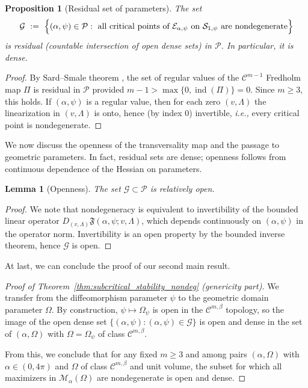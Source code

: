 \documentclass[reqno,11pt]{amsart}
\newtheorem{lemma}[theorem]{Lemma}
\newtheorem{proposition}[theorem]{Proposition}
\theoremstyle{definition}
\begin{document}
\begin{proposition}[Residual set of parameters]\label{prop:residual}
The set
\[
\mathcal{G}\ :=\ \Bigl\{(\alpha,\psi)\in\mathcal{P}:\ \text{all critical points of $\mathcal{E}_{\alpha,\psi}$
on $\mathcal{S}_{1,\psi}$ are nondegenerate}\Bigr\}
\]
is residual (countable intersection of open dense sets) in $\mathcal{P}$. In particular, it is dense.
\end{proposition}

\begin{proof}
By Sard--Smale theorem \cite[Theorem~1.3]{MR185604}, the set of regular values of the $\mathcal{C}^{m-1}$ Fredholm map $\Pi$ is residual in
$\mathcal{P}$ provided $m-1>\max\{0,\operatorname{ind}(\Pi)\}=0$. Since $m\ge 3$, this holds.
If $(\alpha,\psi)$ is a regular value, then for each zero $(v,\Lambda)$ the linearization in $(v,\Lambda)$
is onto, hence (by index $0$) invertible, {\it i.e.,} every critical point is nondegenerate.
\end{proof}


We now discuss the openness of the transversality map and the passage to geometric parameters.
In fact, residual sets are dense; openness follows from continuous dependence of the Hessian on parameters.

\begin{lemma}[Openness]\label{lem:open}
The set $\mathcal{G}\subset \mathcal{P}$ is relatively open.
\end{lemma}

\begin{proof} 
We note that nondegeneracy is equivalent to invertibility of the bounded linear operator
$D_{(v,\Lambda)}\mathfrak{F}(\alpha,\psi;v,\Lambda)$, which depends continuously on $(\alpha,\psi)$ in the operator norm.
Invertibility is an open property by the bounded inverse theorem, hence $\mathcal{G}$ is open.
\end{proof}

At last, we can conclude the proof of our second main result.
\begin{proof}[Proof of Theorem~\ref{thm:subcritical_stability_nondeg} (genericity part)]
We transfer from the diffeomorphism parameter $\psi$ to the geometric domain parameter $\Omega$.
By construction, $\psi\mapsto \Omega_\psi$ is open in the $\mathcal{C}^{m,\beta}$ topology, so the image of the
open dense set $\{(\alpha,\psi): (\alpha,\psi)\in\mathcal{G}\}$ is open and dense in the set of
$(\alpha,\Omega)$ with $\Omega=\Omega_\psi$ of class $\mathcal{C}^{m,\beta}$.

From this, we conclude that for any fixed $m\ge 3$ and among pairs $(\alpha,\Omega)$ 
with $\alpha\in(0,4\pi)$ and $\Omega$ of class $\mathcal{C}^{m,\beta}$ and unit volume, 
the subset for which all maximizers in $\mathcal{M}_\alpha(\Omega)$ are
nondegenerate is open and dense.
\end{proof}
\end{document}

